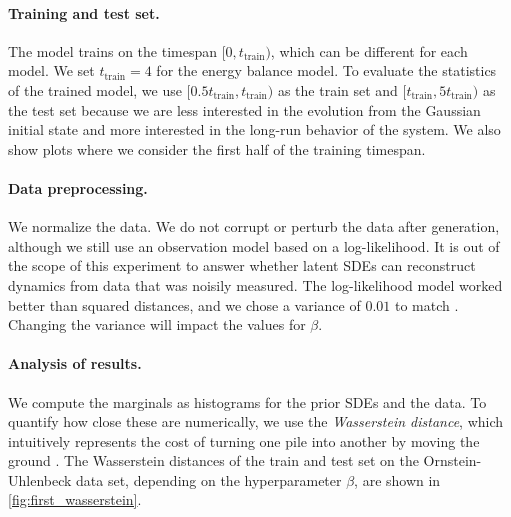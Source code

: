 \documentclass[twoside,11pt]{article}
\begin{document}
\paragraph{Training and test set.}
The model trains on the timespan \([0, t_{\text{train}})\), which can be different for each model. We set \(t_{\text{train}} = 4\) for the energy balance model. To evaluate the statistics of the trained model, we use \([0.5 t_{\text{train}}, t_{\text{train}})\) as the train set and \([t_{\text{train}}, 5 t_{\text{train}})\) as the test set because we are less interested in the evolution from the Gaussian initial state and more interested in the long-run behavior of the system. We also show plots where we consider the first half of the training timespan.

\paragraph{Data preprocessing.}
We normalize the data.
We do not corrupt or perturb the data after generation, although we still use an observation model based on a log-likelihood. It is out of the scope of this experiment to answer whether latent SDEs can reconstruct dynamics from data that was noisily measured. The log-likelihood model worked better than squared distances, and we chose a variance of \(0.01\) to match \citeauthor{li2020scalable} \citep{li2020scalable}. Changing the variance will impact the values for \(\beta\).

\paragraph{Analysis of results.}
We compute the marginals as histograms for the prior SDEs and the data. To quantify how close these are numerically, we use the \emph{Wasserstein distance}, which intuitively represents the cost of turning one pile into another by moving the ground \citep{panaretos2019statistical}. The Wasserstein distances of the train and test set on the Ornstein-Uhlenbeck data set, depending on the hyperparameter \(\beta\), are shown in \cref{fig:first_wasserstein}.
\end{document}
